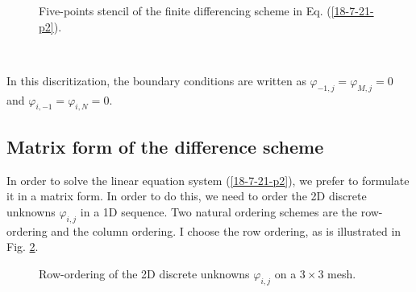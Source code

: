 \documentclass{article}
\begin{document}
\begin{figure}[h]
  \caption{\label{18-7-21-p4}Five-points stencil of the finite differencing
  scheme in Eq. (\ref{18-7-21-p2}).}
\end{figure}

\

In this discritization, the boundary conditions are written as $\varphi_{- 1,
j} = \varphi_{M, j} = 0$ and $\varphi_{i, - 1} = \varphi_{i, N} = 0$.

\subsection{Matrix form of the difference scheme}

In order to solve the linear equation system (\ref{18-7-21-p2}), we prefer to
formulate it in a matrix form. In order to do this, we need to order the 2D
discrete unknowns $\varphi_{i, j}$ in a 1D sequence. Two natural ordering
schemes are the row-ordering and the column ordering. I choose the row
ordering, as is illustrated in Fig. \ref{18-7-21-1}.

\begin{figure}[h]
  \caption{\label{18-7-21-1}Row-ordering of the 2D discrete unknowns
  $\varphi_{i, j}$ on a $3 \times 3$ mesh.}
\end{figure}
\end{document}
